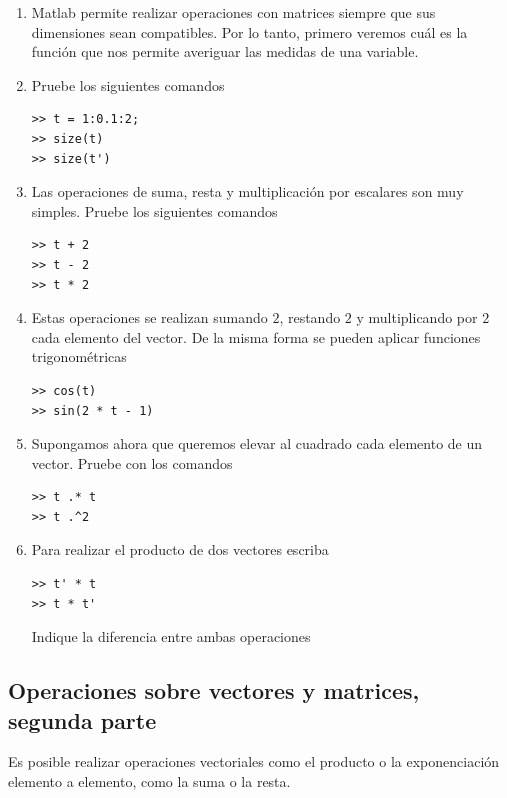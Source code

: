 \begin{enumerate}
\item Matlab permite realizar operaciones con matrices siempre que sus
dimensiones sean compatibles. Por lo tanto, primero veremos cu\'{a}l es
la funci\'{o}n que nos permite averiguar las medidas de una variable.

\item Pruebe los siguientes comandos
\begin{verbatim}
>> t = 1:0.1:2;
>> size(t)
>> size(t')
\end{verbatim}

\item Las operaciones de suma, resta y multiplicaci\'{o}n por escalares son
muy simples. Pruebe los siguientes comandos
\begin{verbatim}
>> t + 2
>> t - 2
>> t * 2
\end{verbatim}

\item Estas operaciones se realizan sumando $2$, restando $2$ y
multiplicando por $2$ cada elemento del vector. De la misma forma se
pueden aplicar funciones trigonom\'{e}tricas
\begin{verbatim}
>> cos(t)
>> sin(2 * t - 1)
\end{verbatim}

\item Supongamos ahora que queremos elevar al cuadrado cada elemento de un
vector. Pruebe con los comandos
\begin{verbatim}
>> t .* t
>> t .^2
\end{verbatim}

\item Para realizar el producto de dos vectores escriba
\begin{verbatim}
>> t' * t
>> t * t'
\end{verbatim}
Indique la diferencia entre ambas operaciones

\end{enumerate}

\subsection{Operaciones sobre vectores y matrices, segunda parte}

Es posible realizar operaciones vectoriales como el producto o la
exponenciaci\'{o}n elemento a elemento, como la suma o la resta.

